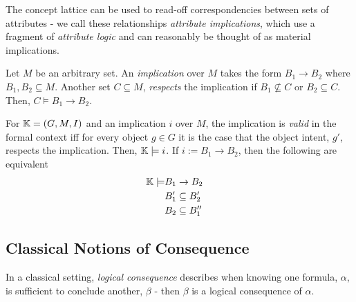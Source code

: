 The concept lattice can be used to read-off correspondencies between sets of attributes - we call these relationships \textit{attribute implications}, which use a fragment of \textit{attribute logic} and can reasonably be thought of as material implications.
%
\begin{definition}
    \label{definition: implication over M}
    Let $M$ be an arbitrary set. An \emph{implication} over $M$ takes the form $B_1 \rightarrow B_2$ where $B_1, B_2 \subseteq M$. Another set $C \subseteq M$, \emph{respects} the implication if $B_1 \not \subseteq C$ or $B_2 \subseteq C$. Then, $C \vDash B_1 \rightarrow B_2$.
\end{definition}
%
\begin{definition}
    \label{definition: modelling an implication}
    For $\mathbb{K} = (G,M,I)$ and an implication $i$ over $M$, the implication is \emph{valid} in the formal context iff for every object $g \in G$ it is the case that the object intent, $g'$, respects the implication. Then, $\mathbb{K} \models i$. If $i := B_1 \rightarrow B_2$, then the following are equivalent
    \begin{align*}
        \mathbb{K}  \models & B_1 \rightarrow B_2  & \\
                    & B_1 ' \subseteq B_2' & \\
                    & B_2 \subseteq B_1''  &
    \end{align*}
\end{definition}


\subsection{Classical Notions of Consequence}
\label{subsection: classical notions of consequence}


In a classical setting, \emph{logical consequence} describes when knowing one formula, $\alpha$, is sufficient to conclude another, $\beta$ - then $\beta$ is a logical consequence of $\alpha$.


